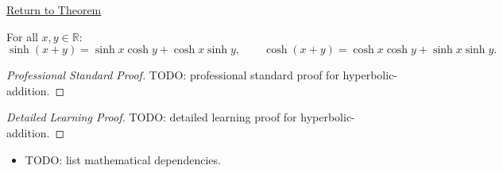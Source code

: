 \newpage
{}
\label{prf:hyperbolic-addition}

\begin{remark*}[Return]
\hyperref[prop:hyperbolic-addition]{Return to Theorem}
\end{remark*}

\begin{theorem*}
For all $x, y \in \mathbb{R}$:
\[
  \sinh(x+y) = \sinh x \cosh y + \cosh x \sinh y,
  \qquad
  \cosh(x+y) = \cosh x \cosh y + \sinh x \sinh y.
\]

\smallskip\noindent
\end{theorem*}

\begin{proof}[Professional Standard Proof]
\LRAProofBodyStart
TODO: professional standard proof for hyperbolic-addition.
\end{proof}

\begin{proof}[Detailed Learning Proof]
\LRAProofBodyStart
TODO: detailed learning proof for hyperbolic-addition.
\end{proof}

\begin{remark*}
\end{remark*}

\begin{dependencies}
\begin{itemize}
  \item TODO: list mathematical dependencies.
\end{itemize}
\end{dependencies}

\clearpage

